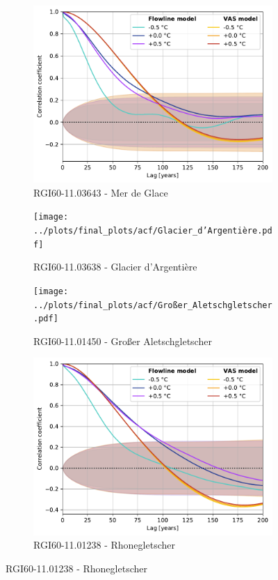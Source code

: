 \begin{figure}[htp]
        \begin{subfigure}[b]{0.48\textwidth}
          \caption{RGI60-11.03643 - Mer de Glace}
          \label{fig:acf:mer_de_glace}
          \centering
          \includegraphics[width=\textwidth]{../plots/final_plots/acf/Mer_de_Glace.pdf}
        \end{subfigure}
        \hfill
        \begin{subfigure}[b]{0.48\textwidth}
          \caption{RGI60-11.03638 - Glacier d'Argentière}
          \label{fig:acf:glacier_d_argentiere}
          \centering
          \texttt{[image: ../plots/final\_plots/acf/Glacier\_d'Argentière.pdf]}
        \end{subfigure}
        \begin{subfigure}[b]{0.48\textwidth}
          \caption{RGI60-11.01450 - Großer Aletschgletscher}
          \label{fig:acf:großer_aletschgletscher}
          \centering
          \texttt{[image: ../plots/final\_plots/acf/Großer\_Aletschgletscher.pdf]}
        \end{subfigure}
        \hfill
        \begin{subfigure}[b]{0.48\textwidth}
          \caption{RGI60-11.01238 - Rhonegletscher}
          \label{fig:acf:rhonegletscher}
          \centering
          \includegraphics[width=\textwidth]{../plots/final_plots/acf/Rhonegletscher.pdf}

\end{subfigure}
\end{figure}
